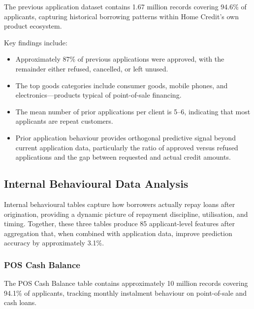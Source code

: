 The previous application dataset contains 1.67 million records covering 94.6\% of applicants, capturing historical borrowing patterns within Home Credit's own product ecosystem.



Key findings include:
\begin{itemize}
    \item Approximately 87\% of previous applications were approved, with the remainder either refused, cancelled, or left unused.
    \item The top goods categories include consumer goods, mobile phones, and electronics---products typical of point-of-sale financing.
    \item The mean number of prior applications per client is 5--6, indicating that most applicants are repeat customers.
    \item Prior application behaviour provides orthogonal predictive signal beyond current application data, particularly the ratio of approved versus refused applications and the gap between requested and actual credit amounts.
\end{itemize}

\subsection{Internal Behavioural Data Analysis}
\label{subsec:behavioural_eda}

Internal behavioural tables capture how borrowers actually repay loans after origination, providing a dynamic picture of repayment discipline, utilisation, and timing. Together, these three tables produce 85 applicant-level features after aggregation that, when combined with application data, improve prediction accuracy by approximately 3.1\%.

\subsubsection{POS Cash Balance}

The POS Cash Balance table contains approximately 10 million records covering 94.1\% of applicants, tracking monthly instalment behaviour on point-of-sale and cash loans.

